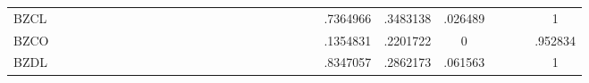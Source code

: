 \begin{table}[htbp]
\begin{tabular}{l*{4}{ccccccc}}
BZCL            &         &         &         &         &         &         &         &         &         &         &         &         &         &         &         &         &         &         &         &         &         & .7364966& .3483138&  .026489&         &         &         &        1\\
BZCO            &         &         &         &         &         &         &         &         &         &         &         &         &         &         &         &         &         &         &         &         &         & .1354831& .2201722&        0&         &         &         &  .952834\\
BZDL            &         &         &         &         &         &         &         &         &         &         &         &         &         &         &         &         &         &         &         &         &         & .8347057& .2862173&  .061563&         &         &         &        1\\
\hline\hline
\end{tabular}
\end{table}
